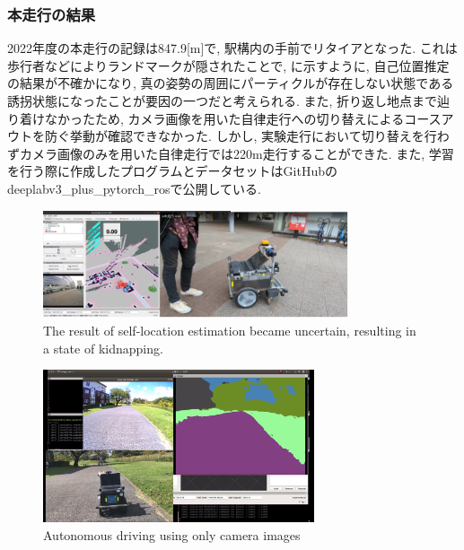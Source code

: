 \documentclass[uplatex, twocolumn, 9pt]{jsproceedings}
\begin{document}
\newpage
\subsubsection{本走行の結果}
2022年度の本走行の記録は847.9[m]で, 駅構内の手前でリタイアとなった. これは歩行者などによりランドマークが隠されたことで, に示すように, 自己位置推定の結果が不確かになり, 真の姿勢の周囲にパーティクルが存在しない状態である誘拐状態\cite{emcl-thesis}になったことが要因の一つだと考えられる. また, 折り返し地点まで辿り着けなかったため, カメラ画像を用いた自律走行への切り替えによるコースアウトを防ぐ挙動が確認できなかった. しかし, 実験走行において切り替えを行わずカメラ画像のみを用いた自律走行では220m走行することができた. また, 学習を行う際に作成したプログラムとデータセットはGitHubのdeeplabv3\_plus\_pytorch\_ros\cite{DeeplabV3}で公開している.

\begin{figure}[h]
  \centering
  \includegraphics[width=90mm]{fig/yuukai1.pdf}
  \caption{The result of self-location estimation became uncertain, resulting in a state of kidnapping.}
  \label{fig:kidnapped}%
\end{figure}

\begin{figure}[h]
  \centering
  \includegraphics[width=80mm]{fig/seg-only.pdf}
  \caption{Autonomous driving using only camera images}
  \label{fig:seg-only}%
\end{figure}

\end{document}
